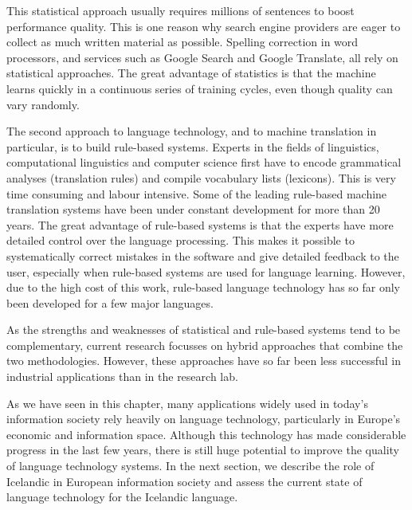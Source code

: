 \begin{multicols}{2}
This statistical approach usually requires millions of sentences to boost performance quality. This is one reason why search engine providers are eager to collect as much written material as possible. Spelling correction in word processors, and services such as Google Search and Google Translate, all rely on statistical approaches. The great advantage of statistics is that the machine learns quickly in a continuous series of training cycles, even though quality can vary randomly.

The second approach to language technology, and to machine translation in particular, is to build rule-based systems. Experts in the fields of linguistics, computational linguistics and computer science first have to encode grammatical analyses (translation rules) and compile vocabulary lists (lexicons). This is very time consuming and labour intensive. Some of the leading rule-based machine translation systems have been under constant development for more than 20 years. The great advantage of rule-based systems is that the experts have more detailed control over the language processing. This makes it possible to systematically correct mistakes in the software and give detailed feedback to the user, especially when rule-based systems are used for language learning. However, due to the high cost of this work, rule-based language technology has so far only been developed for a few major languages. 


As the strengths and weaknesses of statistical and rule-based systems tend to be complementary, current research focusses on hybrid approaches that combine the two methodologies. However, these approaches have so far been less successful in industrial applications than in the research lab. 

As we have seen in this chapter, many applications widely used in today’s information society rely heavily on language technology, particularly in Europe’s economic and information space. Although this technology has made considerable progress in the last few years, there is still huge potential to improve the quality of language technology systems. In the next section, we describe the role of Icelandic in European information society and assess the current state of language technology for the Icelandic language.
\end{multicols}

\clearpage

